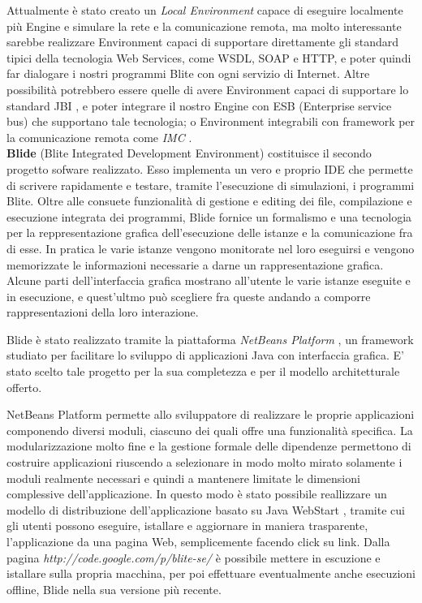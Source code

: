 Attualmente è stato creato un \emph{Local Environment} capace di eseguire
localmente più Engine e simulare la rete e la comunicazione remota, ma molto
interessante sarebbe realizzare Environment capaci di supportare direttamente gli
standard tipici della tecnologia Web Services, come WSDL, SOAP e HTTP, e poter
quindi far dialogare i nostri programmi Blite con ogni servizio di Internet.
Altre possibilità potrebbero essere quelle di avere Environment capaci
di supportare lo standard JBI \cite{JBI}, e poter integrare il nostro Engine con ESB
(Enterprise service bus) che supportano tale tecnologia; o Environment
integrabili con framework per la comunicazione remota come \emph{IMC} \cite{IMC}.
\\

\textbf{Blide} (Blite Integrated Development Environment) costituisce il
secondo progetto sofware realizzato. Esso implementa un
vero e proprio IDE che permette di scrivere rapidamente e testare, tramite
l'esecuzione di simulazioni, i programmi Blite. Oltre alle consuete
funzionalità di gestione e editing dei file, compilazione e esecuzione
integrata dei programmi, Blide fornice un formalismo e una tecnologia per la
reppresentazione grafica dell'esecuzione delle istanze e la comunicazione fra
di esse. In pratica le varie istanze vengono monitorate nel loro eseguirsi e
vengono memorizzate le informazioni necessarie a darne un rappresentazione
grafica. Alcune parti dell'interfaccia grafica mostrano all'utente le varie
istanze eseguite e in esecuzione, e quest'ultmo può scegliere fra queste
andando a comporre rappresentazioni della loro interazione.

Blide è stato realizzato tramite la piattaforma \emph{NetBeans Platform}
\cite{NBPlatSite}, un framework studiato per facilitare lo sviluppo di applicazioni
Java con interfaccia grafica. E' stato scelto tale progetto per la sua
completezza e per il modello architetturale offerto. 

NetBeans Platform permette allo sviluppatore di realizzare le proprie
applicazioni componendo diversi moduli, ciascuno dei quali offre una
funzionalità specifica. La modularizzazione molto fine e la gestione
formale delle dipendenze permettono di costruire applicazioni riuscendo a
selezionare in modo molto mirato solamente i moduli realmente necessari e
quindi a mantenere limitate le dimensioni complessive dell'applicazione. 
In questo modo è stato possibile reallizzare un modello di distribuzione
dell'applicazione basato su Java WebStart \cite{JavaWS}, tramite cui gli utenti
possono eseguire, istallare e aggiornare in maniera trasparente, l'applicazione
da una pagina Web, semplicemente facendo click su link. Dalla pagina 
\emph{http://code.google.com/p/blite-se/} è possibile mettere in escuzione e
istallare sulla propria macchina, per poi effettuare eventualmente anche
esecuzioni offline, Blide nella sua versione più recente.
\\

